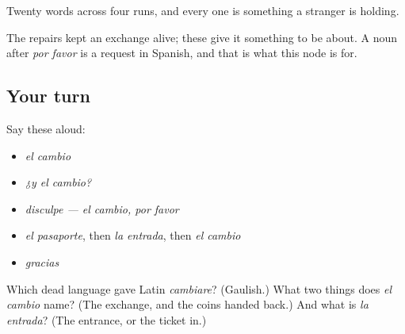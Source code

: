 \begin{grammarlens}[title={What you've built}]
Twenty words across four runs, and every one is something a stranger is holding.

The repairs kept an exchange alive; these give it something to be about. A noun after \emph{por favor} is a request in Spanish, and that is what this node is for.
\end{grammarlens}

\subsection*{Your turn}
Say these aloud:

\begin{itemize}
\raggedright
  \item \emph{el cambio}
  \item \emph{¿y el cambio?}
  \item \emph{disculpe — el cambio, por favor}
  \item \emph{el pasaporte}, then \emph{la entrada}, then \emph{el cambio}
  \item \emph{gracias}
\end{itemize}

\begin{tcolorbox}[breakable,colback=teal!4,colframe=teal!35!black,title={Before you move on}]
Which dead language gave Latin \emph{cambiare}? (Gaulish.) What two things does \emph{el cambio} name? (The exchange, and the coins handed back.) And what is \emph{la entrada}? (The entrance, or the ticket in.)
\end{tcolorbox}
